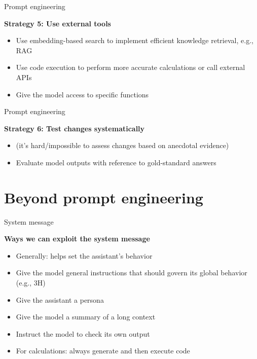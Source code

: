 \begin{vbframe}{Prompt engineering}

\vfill

\textbf{Strategy 5: Use external tools}


\begin{itemize}


\item     Use embedding-based search to implement efficient
    knowledge retrieval, e.g., RAG
\item         Use code execution to perform more accurate
    calculations or call external APIs
\item         Give the model access to specific functions

\end{itemize}

\vfill

\end{vbframe}
\begin{vbframe}{Prompt engineering}

\vfill

\textbf{Strategy 6: Test changes systematically}


\begin{itemize}
\item (it's hard/impossible to assess changes based on
anecdotal evidence)
\item     Evaluate model outputs with reference to gold-standard answers

\end{itemize}

\vfill

\end{vbframe}





\section{Beyond prompt engineering}




\begin{vbframe}{System message}

\vfill

\textbf{Ways we can exploit the system message}

	\begin{itemize}
		\item Generally: helps set the assistant's
		behavior
		\item Give the model general instructions
		that should govern its global behavior
		(e.g., 3H)
                		\item Give the assistant a persona
                \item Give the model a summary of a long context
                \item Instruct the model to check its own output
\item For calculations: always generate and then execute code
	\end{itemize}

\vfill

\end{vbframe}



